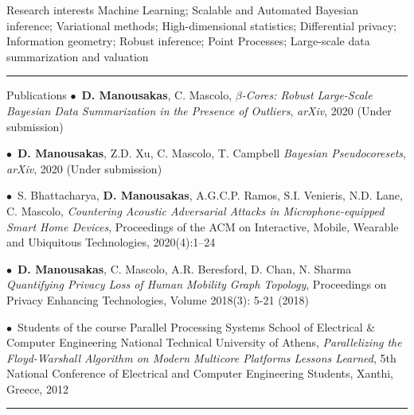 \documentclass[12pt]{resume}
\begin{document}

\begin{category}{Research interests}
\citemnobullet Machine Learning; Scalable and Automated Bayesian inference; Variational methods; High-dimensional statistics; Differential privacy; Information geometry; Robust inference; Point Processes; Large-scale data summarization and valuation

\noindent\rule{\textwidth}{0.2pt}
\end{category}

\begin{category}{Publications}
\citemnobullet $\bullet$~\textbf{D. Manousakas}, C. Mascolo, \emph{$\beta$-Cores: Robust Large-Scale Bayesian Data Summarization in the Presence of Outliers}, \emph{arXiv}, 2020 (Under submission)

\citemnobullet $\bullet$~\textbf{D. Manousakas}, Z.D. Xu, C. Mascolo, T. Campbell \emph{Bayesian Pseudocoresets}, \emph{arXiv}, 2020 (Under submission)

\citemnobullet $\bullet$~S. Bhattacharya, \textbf{D. Manousakas}, A.G.C.P. Ramos, S.I. Venieris, N.D. Lane, C. Mascolo, \emph{Countering Acoustic Adversarial Attacks in Microphone-equipped Smart Home Devices}, Proceedings of the ACM on Interactive, Mobile, Wearable and Ubiquitous Technologies, 2020(4):1--24

\citemnobullet $\bullet$~\textbf{D. Manousakas}, C. Mascolo, A.R. Beresford, D. Chan, N. Sharma \emph{Quantifying Privacy Loss of Human Mobility Graph Topology}, Proceedings on Privacy Enhancing Technologies, Volume 2018(3): 5-21 (2018)

\citemnobullet $\bullet$~Students of the course Parallel Processing Systems  School of Electrical \& Computer Engineering National Technical University of Athens,
\textit{Parallelizing the Floyd-Warshall Algorithm on
	Modern Multicore Platforms
	Lessons Learned}, 5th National Conference of Electrical and Computer Engineering Students, Xanthi, Greece, 2012 

\noindent\rule{\textwidth}{0.2pt}
\end{category}
\end{document}
